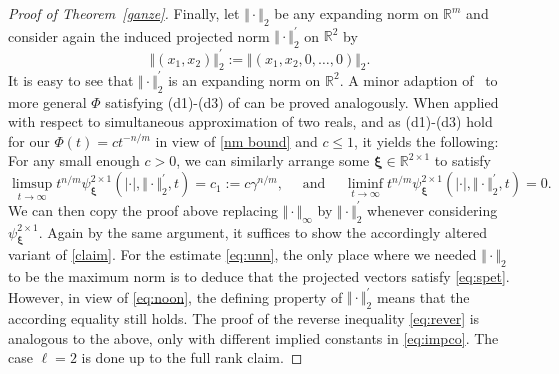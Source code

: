 \documentclass[10pt]{amsart}
\theoremstyle{definition}
\newcommand{\ux}{\boldsymbol{\xi}}
\begin{document}
\begin{proof}[Proof of Theorem~\ref{ganze}]
    Finally, let $\Vert\cdot\Vert_2$ be any expanding norm on 
    $\mathbb{R}^m$
    and consider again the induced 
    projected norm $\Vert\cdot\Vert_2^{\prime}$ 
    on $\mathbb{R}^2$ by
    \[
    \Vert (x_1,x_2)\Vert_2^{\prime}:= \Vert (x_1,x_2,0,\ldots,0)\Vert_2.
    \]
    It is easy to see that $\Vert\cdot\Vert_2^{\prime}$ is an expanding norm
    on $\mathbb{R}^2$.
    A minor adaption of~\cite[Corollary~2]{j1} to more general $\Phi$ satisfying (d1)-(d3) of \cite{j1} can be proved analogously. When applied with respect to simultaneous approximation of two reals, and
    as (d1)-(d3) hold for our $\Phi(t)=ct^{-n/m}$
    in view of \eqref{nm bound} and $c\le 1$, 
    it yields the following:
    For any small enough $c>0$, we can similarly arrange some $\ux\in\mathbb{R}^{2\times 1}$ to satisfy
      \[
    \limsup_{t\to\infty} t^{n/m} \psi^{ 2\times1}_{\ux}(|\cdot|,\Vert\cdot\Vert_2^{\prime},t) = c_1:=c \gamma^{n/m},\quad \text{ and } \quad \liminf_{t\to\infty} t^{n/m} \psi^{2\times1}_{\ux}(|\cdot|,\Vert\cdot\Vert_2^{\prime},t) = 0.\]
    We can then copy the proof above
    replacing $\Vert\cdot \Vert_{\infty}$ 
    by $\Vert\cdot\Vert_2^{\prime}$ whenever considering $\psi^{2\times 1}_{\ux}$.
    Again by the same argument, it suffices to show the accordingly altered variant of \eqref{claim}. For the estimate \eqref{eq:unn},
    the only place where we needed
    $\Vert\cdot\Vert_2$ to be
    the maximum norm is to deduce
    that the projected vectors
    satisfy \eqref{eq:spet}. However, 
    in view of \eqref{eq:noon},
    the defining property of 
    $\Vert\cdot\Vert_2^{\prime}$ means that the according equality 
    still holds. The proof of the reverse inequality 
     \eqref{eq:rever}
    is analogous to the above, only
    with different implied constants
    in \eqref{eq:impco}. The case $\ell=2$ is done up to the full rank claim. 
    

\end{proof}
\end{document}
